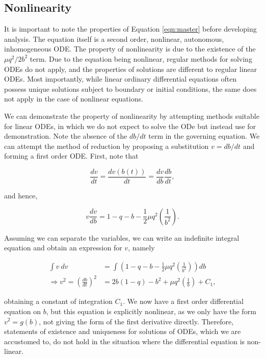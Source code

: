 \documentclass{article}
\begin{document}
\subsection{Nonlinearity}

It is important to note the properties of Equation \ref{eqn:master} before developing analysis.
The equation itself is a second order, nonlinear, autonomous, inhomogeneous ODE.
The property of nonlinearity is due to the existence of the $\mu q^2/2b^2$ term.
Due to the equation being nonlinear, regular methods for solving ODEs do not apply,
and the properties of solutions are different to regular linear ODEs.
Most importantly, while linear ordinary differential equations often possess unique solutions subject to boundary or initial conditions,
the same does not apply in the case of nonlinear equations.

We can demonstrate the property of nonlinearity by attempting methods suitable for linear ODEs,
in which we do not expect to solve the ODe but instead use for demonstration.
Note the absence of the $db/dt$ term in the governing equation.
We can attempt the method of reduction by proposing a substitution $v=db/dt$ and forming a first order ODE.
First, note that

\begin{equation}
    \frac{dv}{dt} = \frac{dv(b(t))}{dt} = \frac{dv}{db}\frac{db}{dt},
\end{equation}

and hence,

\begin{equation}
    v \frac{dv}{db} = 1 - q - b - \frac{1}{2}\mu q^2\left( \frac{1}{b^2} \right).
\end{equation}

Assuming we can separate the variables, we can write an indefinite integral equation and obtain an expression for $v$, namely

\begin{equation}
    \begin{aligned}
        \int v~dv &= \int \left(1 - q - b - \frac{1}{2}\mu q^2\left( \frac{1}{b^2} \right)\right) db \\
        \Rightarrow v^2 = \left(\frac{db}{dt}\right)^2 &= 2b(1-q) - b^2 + \mu q^2\left(\frac{1}{b}\right) + C_1,
    \end{aligned}
    \label{eqn:first_order_reduction}
\end{equation}

obtaining a constant of integration $C_1$.
We now have a first order differential equation on $b$, %
but this equation is explicitly nonlinear, as we only have the form $v^2 = g(b)$,
not giving the form of the first derivative directly.
Therefore, statements of existence and uniqueness for solutions of ODEs,
which we are accustomed to,
do not hold in the situation where the differential equation is non-linear.
\end{document}

